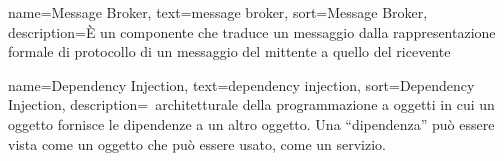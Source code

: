 {
    name=Message Broker,
    text=message broker,
    sort=Message Broker,
    description={È un componente che traduce un messaggio dalla rappresentazione formale di protocollo di un messaggio del mittente a quello del ricevente}
}

{
    name=Dependency Injection,
    text=dependency injection,
    sort=Dependency Injection,
    description={\gloss\ architetturale della programmazione a oggetti in cui un oggetto fornisce le dipendenze a un altro oggetto. Una ``dipendenza'' può essere vista come un oggetto che può essere usato, come un servizio.}
}
